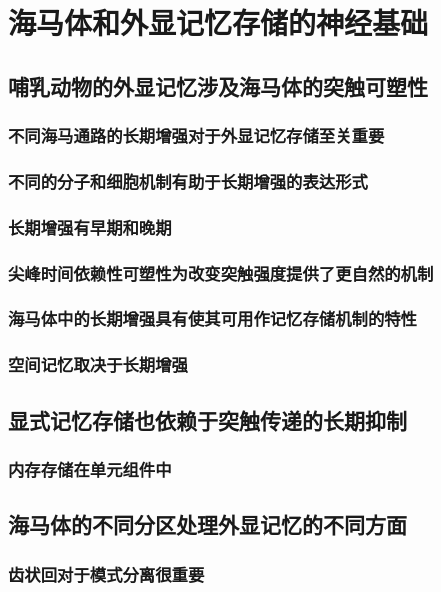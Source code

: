 \chapter{海马体和外显记忆存储的神经基础}

\section{哺乳动物的外显记忆涉及海马体的突触可塑性}
\subsection{不同海马通路的长期增强对于外显记忆存储至关重要}
\subsection{不同的分子和细胞机制有助于长期增强的表达形式}
\subsection{长期增强有早期和晚期}
\subsection{尖峰时间依赖性可塑性为改变突触强度提供了更自然的机制}
\subsection{海马体中的长期增强具有使其可用作记忆存储机制的特性}
\subsection{空间记忆取决于长期增强}

\section{显式记忆存储也依赖于突触传递的长期抑制}
\subsection{内存存储在单元组件中}

\section{海马体的不同分区处理外显记忆的不同方面}
\subsection{齿状回对于模式分离很重要}
